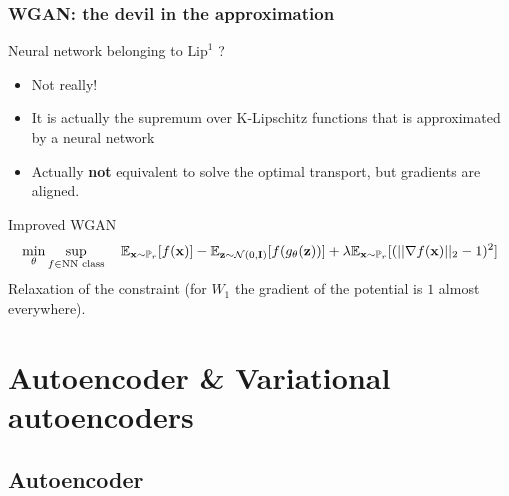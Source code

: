 \documentclass[french,9pt]{beamer}
\def\z{{\bf z}}
\newcommand{\x}{{\bf x}}
\begin{document}
  \begin{frame}
    \frametitle{WGAN: the devil in the approximation}

\begin{block}{Neural network belonging to  $\text{Lip}^1$ ?}

  \begin{itemize}
    \item Not really! 
    \item It is actually the supremum over K-Lipschitz functions that is approximated by a neural network 
  \item Actually  {\bf not} equivalent to solve the optimal transport, but gradients are aligned.

  \end{itemize}
  
\end{block}\vspace{-2mm}


\begin{block}{Improved WGAN \cite{DBLP:journals/corr/GulrajaniAADC17}\vspace{-2mm}}
  $$
  \min_{\theta}\sup_{f \in \text{NN class}}\quad \mathbb{E}_{\x\sim \mathbb{P}_{r}}[ f(\x)] - \mathbb{E}_{\z\sim\mathcal{N}(0,\mathbf{I})} [f(g_{\theta}(\z))] + \lambda \mathbb{E}_{\x\sim \mathbb{P}_{r}}[ (||\nabla f(\x)||_2  - 1)^2 ]
  $$
  Relaxation of the constraint (for $W_1$ the gradient of the potential is $1$ almost everywhere).
\end{block}
  
  \end{frame}


\section{Autoencoder \& Variational autoencoders}

\subsection{Autoencoder}


\end{document}
